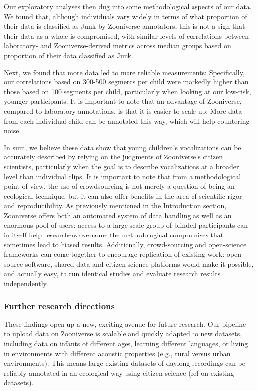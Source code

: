 \documentclass[english,,man,floatsintext]{apa6}
\begin{document}
Our exploratory analyses then dug into some methodological aspects of our data. We found that, although individuals vary widely in terms of what proportion of their data is classified as Junk by Zooniverse annotators, this is not a sign that their data as a whole is compromised, with similar levels of correlations between laboratory- and Zooniverse-derived metrics across median groups based on proportion of their data classified as Junk.

Next, we found that more data led to more reliable measurements: Specifically, our correlations based on 300-500 segments per child were markedly higher than those based on 100 segments per child, particularly when looking at our low-risk, younger participants. It is important to note that an advantage of Zooniverse, compared to laboratory annotations, is that it is easier to scale up: More data from each individual child can be annotated this way, which will help countering noise.

In sum, we believe these data show that young children's vocalizations can be accurately described by relying on the judgments of Zooniverse's citizen scientists, particularly when the goal is to describe vocalizations at a broader level than individual clips. It is important to note that from a methodological point of view, the use of crowdsourcing is not merely a question of being an ecological technique, but it can also offer benefits in the area of scientific rigor and reproducibility. As previously mentioned in the Introduction section, Zooniverse offers both an automated system of data handling as well as an enormous pool of users: access to a large-scale group of blinded participants can in itself help researchers overcome the methodological compromises that sometimes lead to biased results. Additionally, crowd-sourcing and open-science frameworks can come together to encourage replication of existing work: open-source software, shared data and citizen science platforms would make it possible, and actually easy, to run identical studies and evaluate research results independently.

\hypertarget{further-research-directions}{%
\subsubsection{Further research directions}\label{further-research-directions}}

These findings open up a new, exciting avenue for future research. Our pipeline to upload data on Zooniverse is scalable and quickly adapted to new datasets, including data on infants of different ages, learning different languages, or living in environments with different acoustic properties (e.g., rural versus urban environments). This means large existing datasets of daylong recordings can be reliably annotated in an ecological way using citizen science (ref on existing datasets).
\end{document}
